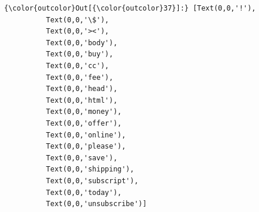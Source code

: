 \documentclass[11pt]{article}
\begin{document}
\begin{Verbatim}[commandchars=\\\{\}]
{\color{outcolor}Out[{\color{outcolor}37}]:} [Text(0,0,'!'),
          Text(0,0,'\$'),
          Text(0,0,'><'),
          Text(0,0,'body'),
          Text(0,0,'buy'),
          Text(0,0,'cc'),
          Text(0,0,'fee'),
          Text(0,0,'head'),
          Text(0,0,'html'),
          Text(0,0,'money'),
          Text(0,0,'offer'),
          Text(0,0,'online'),
          Text(0,0,'please'),
          Text(0,0,'save'),
          Text(0,0,'shipping'),
          Text(0,0,'subscript'),
          Text(0,0,'today'),
          Text(0,0,'unsubscribe')]
\end{Verbatim}
            
    \begin{center}
    \end{center}
    { \hspace*{\fill} \\}
    
\end{document}
